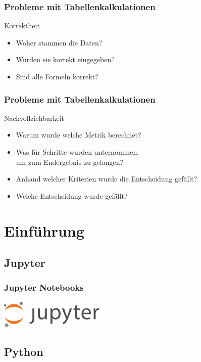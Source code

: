 \documentclass{beamer}
\begin{document}
\begin{frame}
  \frametitle{Probleme mit Tabellenkalkulationen}
  \begin{block}{Korrektheit}
    \begin{itemize}
    \item Woher stammen die Daten?
    \item Wurden sie korrekt eingegeben?
    \item Sind alle Formeln korrekt?
    \end{itemize}
  \end{block}
\end{frame}

\begin{frame}
  \frametitle{Probleme mit Tabellenkalkulationen}
  \begin{block}{Nachvollziehbarkeit}
    \begin{itemize}
    \item Warum wurde welche Metrik berechnet?
    \item Was f\"ur Schritte wurden unternommen, \\ um zum Endergebnis zu gelangen?
    \item Anhand welcher Kriterien wurde die Entscheidung gef\"allt?
    \item Welche Entscheidung wurde gef\"allt?
    \end{itemize}
  \end{block}
\end{frame}


\section{Einf\"uhrung}

\subsection{Jupyter}

\begin{frame}
  \frametitle{Jupyter Notebooks}
  \includegraphics[width=2in]{jupyter-logo.png}
\end{frame}

\subsection{Python}
\end{document}
